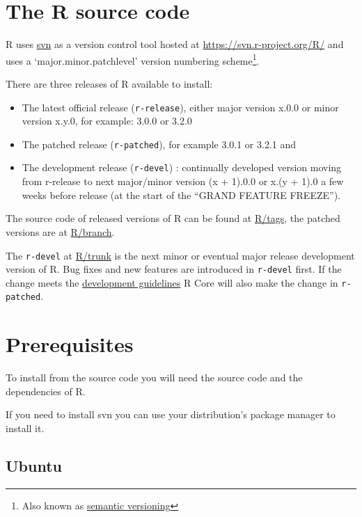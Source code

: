 \documentclass[
  letterpaper,
  DIV=11,
  numbers=noendperiod]{scrreprt}
\begin{document}
\section{The R source code}\label{the-r-source-code}

R uses \href{https://subversion.apache.org/}{svn} as a version control
tool hosted at \url{https://svn.r-project.org/R/} and uses a
`major.minor.patchlevel' version numbering scheme\footnote{Also known as
  \href{https://en.wikipedia.org/wiki/Software_versioning\#Semantic_versioning}{semantic
  versioning}}.

There are three releases of R available to install:

\begin{itemize}
\item
  The latest official release (\texttt{r-release}), either major version
  x.0.0 or minor version x.y.0, for example: 3.0.0 or 3.2.0
\item
  The patched release (\texttt{r-patched}), for example 3.0.1 or 3.2.1
  and
\item
  The development release (\texttt{r-devel}) : continually developed
  version moving from r-release to next major/minor version (x + 1).0.0
  or x.(y + 1).0 a few weeks before release (at the start of the ``GRAND
  FEATURE FREEZE'').
\end{itemize}

The source code of released versions of R can be found at
\href{https://svn.r-project.org/R/tags/}{R/tags}, the patched versions
are at \href{https://svn.r-project.org/R/branches/}{R/branch}.

The \texttt{r-devel} at
\href{https://svn.r-project.org/R/trunk}{R/trunk} is the next minor or
eventual major release development version of R. Bug fixes and new
features are introduced in \texttt{r-devel} first. If the change meets
the
\href{https://developer.r-project.org/devel-guidelines.txt}{development
guidelines} R Core will also make the change in \texttt{r-patched}.

\section{Prerequisites}\label{prerequisites}

To install from the source code you will need the source code and the
dependencies of R.

If you need to install svn you can use your distribution's package
manager to install it.

\subsection{Ubuntu}\label{ubuntu}
\end{document}

